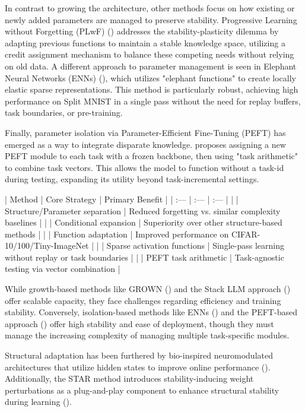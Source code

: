 \documentclass[11pt]{article}
\begin{document}
In contrast to growing the architecture, other methods focus on how existing or newly added parameters are managed to preserve stability. Progressive Learning without Forgetting (PLwF) (\citep{2211.15215}) addresses the stability-plasticity dilemma by adapting previous functions to maintain a stable knowledge space, utilizing a credit assignment mechanism to balance these competing needs without relying on old data. A different approach to parameter management is seen in Elephant Neural Networks (ENNs) (\citep{2310.01365}), which utilizes "elephant functions" to create locally elastic sparse representations. This method is particularly robust, achieving high performance on Split MNIST in a single pass without the need for replay buffers, task boundaries, or pre-training.

Finally, parameter isolation via Parameter-Efficient Fine-Tuning (PEFT) has emerged as a way to integrate disparate knowledge. \citep{2502.10966} proposes assigning a new PEFT module to each task with a frozen backbone, then using "task arithmetic" to combine task vectors. This allows the model to function without a task-id during testing, expanding its utility beyond task-incremental settings.

| Method | Core Strategy | Primary Benefit |
| :--- | :--- | :--- |
| \citep{1904.00310} | Structure/Parameter separation | Reduced forgetting vs. similar complexity baselines |
| \citep{2110.00908} | Conditional expansion | Superiority over other structure-based methods |
| \citep{2211.15215} | Function adaptation | Improved performance on CIFAR-10/100/Tiny-ImageNet |
| \citep{2310.01365} | Sparse activation functions | Single-pass learning without replay or task boundaries |
| \citep{2502.10966} | PEFT task arithmetic | Task-agnostic testing via vector combination |

While growth-based methods like GROWN (\citep{2110.00908}) and the Stack LLM approach (\citep{2509.01213}) offer scalable capacity, they face challenges regarding efficiency and training stability. Conversely, isolation-based methods like ENNs (\citep{2310.01365}) and the PEFT-based approach (\citep{2502.10966}) offer high stability and ease of deployment, though they must manage the increasing complexity of managing multiple task-specific modules.

Structural adaptation has been furthered by bio-inspired neuromodulated architectures that utilize hidden states to improve online performance (\citep{2308.04539}). Additionally, the STAR method introduces stability-inducing weight perturbations as a plug-and-play component to enhance structural stability during learning (\citep{2503.01595}).
\end{document}
